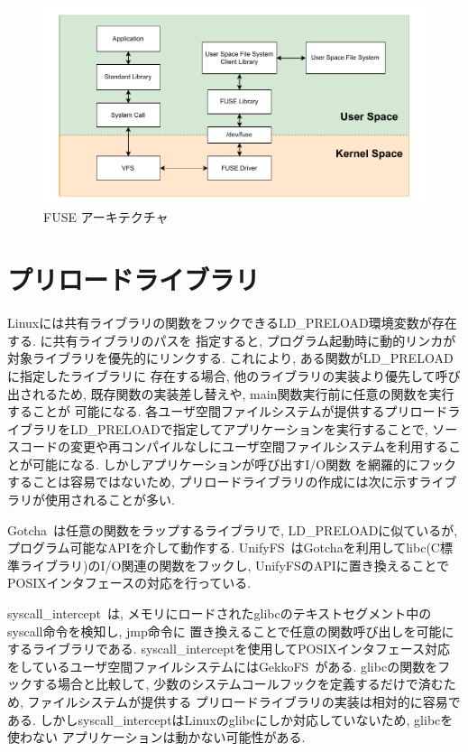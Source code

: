 \documentclass[a4paper,11pt]{jreport}
\begin{document}
\begin{figure}[h]
	\begin{minipage}[b]{1\columnwidth}
		\centering
		\includegraphics[width=0.9\linewidth]{./figure/FUSE.pdf}
		\caption{FUSE アーキテクチャ}
		\label{fig:FUSE}
	\end{minipage}
\end{figure}

\newpage


\section{プリロードライブラリ}
Linuxには共有ライブラリの関数をフックできるLD\_PRELOAD環境変数が存在する. に共有ライブラリのパスを
指定すると, プログラム起動時に動的リンカが対象ライブラリを優先的にリンクする. これにより, ある関数がLD\_PRELOADに指定したライブラリに
存在する場合, 他のライブラリの実装より優先して呼び出されるため, 既存関数の実装差し替えや, main関数実行前に任意の関数を実行することが
可能になる. 各ユーザ空間ファイルシステムが提供するプリロードライブラリをLD\_PRELOADで指定してアプリケーションを実行することで, 
ソースコードの変更や再コンパイルなしにユーザ空間ファイルシステムを利用することが可能になる. しかしアプリケーションが呼び出すI/O関数
を網羅的にフックすることは容易ではないため, プリロードライブラリの作成には次に示すライブラリが使用されることが多い. 

Gotcha~\cite{gotcha}は任意の関数をラップするライブラリで, LD\_PRELOADに似ているが, プログラム可能なAPIを介して動作する. 
UnifyFS~\cite{10177390}はGotchaを利用してlibc(C標準ライブラリ)のI/O関連の関数をフックし, UnifyFSのAPIに置き換えることで
POSIXインタフェースの対応を行っている.

syscall\_intercept~\cite{syscall-intercept}は, メモリにロードされたglibcのテキストセグメント中のsyscall命令を検知し, jmp命令に
置き換えることで任意の関数呼び出しを可能にするライブラリである.
syscall\_interceptを使用してPOSIXインタフェース対応をしているユーザ空間ファイルシステムにはGekkoFS~\cite{8514892}がある.
glibcの関数をフックする場合と比較して, 少数のシステムコールフックを定義するだけで済むため, ファイルシステムが提供する
プリロードライブラリの実装は相対的に容易である. しかしsyscall\_interceptはLinuxのglibcにしか対応していないため, glibcを使わない
アプリケーションは動かない可能性がある.
\end{document}
